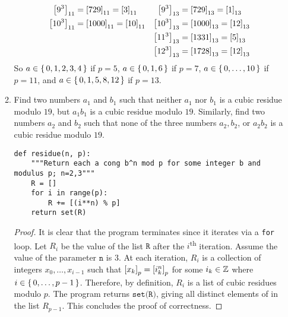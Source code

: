 \documentclass[10pt]{article}
\begin{document}
\begin{enumerate}[itemsep=1em,label=\Alph*.,leftmargin=*]
\begin{enumerate}[itemsep=1em, label=(\alph*), leftmargin=*]
{\begin{minipage}{\dimexpr\linewidth-2\fboxrule-2\fboxsep}
\begin{align*}
                            \left[{9^3}\right]_{{11}} &= \left[{729}\right]_{{11}} = \left[{3}\right]_{{11}} & \left[{9^3}\right]_{{13}} &= \left[{729}\right]_{{13}} = \left[{1}\right]_{{13}}\\
                            \left[{10^3}\right]_{{11}} &= \left[{1000}\right]_{{11}} = \left[{10}\right]_{{11}} & \left[{10^3}\right]_{{13}} &= \left[{1000}\right]_{{13}} = \left[{12}\right]_{{13}}\\
                            &&\left[{11^3}\right]_{{13}} &= \left[{1331}\right]_{{13}} = \left[{5}\right]_{{13}}\\
                            &&\left[{12^3}\right]_{{13}} &= \left[{1728}\right]_{{13}} = \left[{12}\right]_{{13}}
                    \end{align*}
                        So $a \in \set{0,1,2,3,4}$ if $p=5$, $a \in \set{0,1,6}$ if $p=7$, $a \in \set{0,\ldots,10}$ if $p=11$, and $a \in \set{0,1,5,8,12}$ if $p=13$.
\end{minipage}}

\item Find two numbers $a_1$ and $b_1$ such that neither $a_1$ nor $b_1$ is a cubic residue modulo $19$, but $a_1b_1$ is a cubic residue modulo $19$. Similarly, find two numbers $a_2$ and $b_2$ such that none of the three numbers $a_2,b_2$, or $a_2b_2$ is a cubic residue modulo $19$.
                \vspace{1em}
                    \begin{lstlisting}
def residue(n, p):
    """Return each a cong b^n mod p for some integer b and modulus p; n=2,3"""
    R = []
    for i in range(p):
        R += [(i**n) % p]
    return set(R)
                    \end{lstlisting}
                    \begin{proof}
                        It is clear that the program terminates since it iterates via a \texttt{for} loop. Let $R_i$ be the value of the list $\texttt{R}$ after the $i$\textsuperscript{th} iteration. Assume the value of the parameter $\texttt{n}$ is $3$. At each iteration, $R_i$ is a collection of integers $x_0,\ldots,x_{i-1}$ such that $\left[{x_k}\right]_{{p}}=\left[{i_k^n}\right]_{{p}}$ for some $i_k \in \mathbb{Z}$ where $i \in \set{0,\ldots,p-1}$. Therefore, by definition, $R_i$ is a list of cubic residues modulo $p$. The program returns $\texttt{set(R)}$, giving all distinct elements of in the list $R_{p-1}$. This concludes the proof of correctness. 
                    \end{proof}
                    

\end{enumerate}
\end{enumerate}
\end{document}
